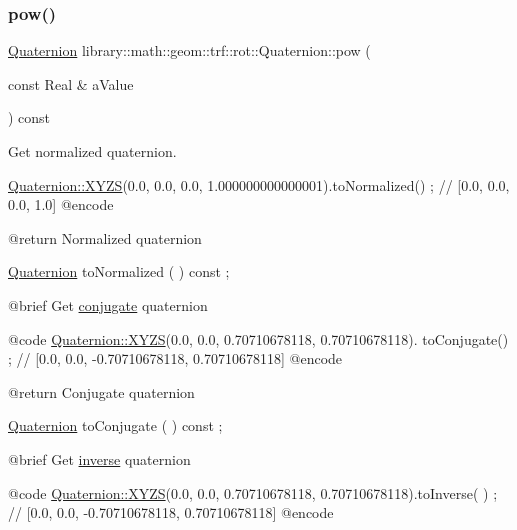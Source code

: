 \subsubsection{\texorpdfstring{pow()}{pow()}}
{\footnotesize\ttfamily \hyperlink{classlibrary_1_1math_1_1geom_1_1trf_1_1rot_1_1_quaternion}{Quaternion} library\+::math\+::geom\+::trf\+::rot\+::\+Quaternion\+::pow (\begin{DoxyParamCaption}\item[{const Real \&}]{a\+Value }\end{DoxyParamCaption}) const}



Get normalized quaternion. 


\begin{DoxyCode}
                        \hyperlink{classlibrary_1_1math_1_1geom_1_1trf_1_1rot_1_1_quaternion_afff9523c7dcbfbbc521736121e62ad41}{Quaternion::XYZS}(0.0, 0.0, 0.0, 1.000000000000001).toNormalized() ;
       \textcolor{comment}{// [0.0, 0.0, 0.0, 1.0]}
    @encode
   
    @\textcolor{keywordflow}{return}             Normalized quaternion

\hyperlink{classlibrary_1_1math_1_1geom_1_1trf_1_1rot_1_1_quaternion_aa7f459a08f5af38b9f7676a6bf36a21c}{Quaternion}              toNormalized                                ( ) \textcolor{keyword}{const} ;

    @brief              Get \hyperlink{classlibrary_1_1math_1_1geom_1_1trf_1_1rot_1_1_quaternion_a4c584b96ce248b069a85adb1c5abd74c}{conjugate} quaternion
   
    @code
                        \hyperlink{classlibrary_1_1math_1_1geom_1_1trf_1_1rot_1_1_quaternion_afff9523c7dcbfbbc521736121e62ad41}{Quaternion::XYZS}(0.0, 0.0, 0.70710678118, 0.70710678118).
      toConjugate() ; \textcolor{comment}{// [0.0, 0.0, -0.70710678118, 0.70710678118]}
    @encode
   
    @\textcolor{keywordflow}{return}             Conjugate quaternion

\hyperlink{classlibrary_1_1math_1_1geom_1_1trf_1_1rot_1_1_quaternion_aa7f459a08f5af38b9f7676a6bf36a21c}{Quaternion}              toConjugate                                 ( ) \textcolor{keyword}{const} ;

    @brief              Get \hyperlink{classlibrary_1_1math_1_1geom_1_1trf_1_1rot_1_1_quaternion_a596228c41391cbba85ca425d9c7c3dbd}{inverse} quaternion
   
    @code
                        \hyperlink{classlibrary_1_1math_1_1geom_1_1trf_1_1rot_1_1_quaternion_afff9523c7dcbfbbc521736121e62ad41}{Quaternion::XYZS}(0.0, 0.0, 0.70710678118, 0.70710678118).toInverse(
      ) ; \textcolor{comment}{// [0.0, 0.0, -0.70710678118, 0.70710678118]}
    @encode
   

\end{DoxyCode}
